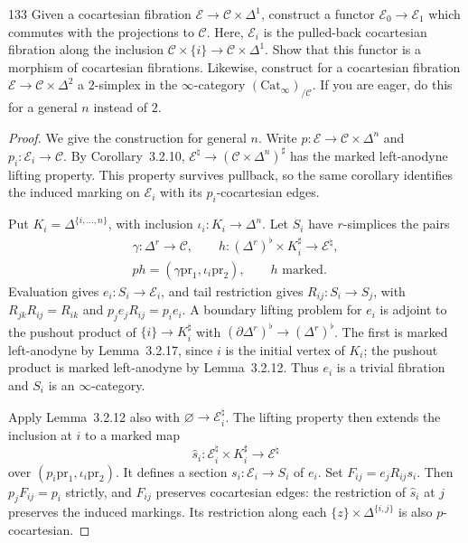 \begin{exercise}{133}
Given a cocartesian fibration $\mathcal E\to\mathcal C\times\Delta^1$, construct a functor $\mathcal E_0\to\mathcal E_1$
which commutes with the projections to $\mathcal C$. Here, $\mathcal E_i$ is the pulled-back cocartesian
fibration along the inclusion $\mathcal C\times\{i\}\to\mathcal C\times\Delta^1$. Show that this functor is a morphism
of cocartesian fibrations. Likewise, construct for a cocartesian fibration $\mathcal E\to\mathcal C\times\Delta^2$ a
$2$-simplex in the $\infty$-category $(\mathrm{Cat}_\infty)_{/\mathcal C}$. If you are eager, do this for a general $n$ instead
of $2$.

\begin{proof}
We give the construction for general $n$.
Write $p\colon\mathcal E\to\mathcal C\times\Delta^n$ and
$p_i\colon\mathcal E_i\to\mathcal C$.
By Corollary~3.2.10, $\mathcal E^{\natural}\to(\mathcal C\times\Delta^n)^{\sharp}$
has the marked left-anodyne lifting property.
This property survives pullback, so the same corollary identifies the
induced marking on $\mathcal E_i$ with its $p_i$-cocartesian edges.

Put $K_i=\Delta^{\{i,\ldots,n\}}$, with inclusion $\iota_i\colon K_i\to\Delta^n$.
Let $S_i$ have $r$-simplices the pairs
\[
 \begin{gathered}
  \gamma\colon\Delta^r\to\mathcal C,\qquad
  h\colon(\Delta^r)^{\flat}\times K_i^{\sharp}\to\mathcal E^{\natural},\\
  ph=(\gamma\mathrm{pr}_1,\iota_i\mathrm{pr}_2),\qquad h\text{ marked}.
 \end{gathered}
\]
Evaluation gives $e_i\colon S_i\to\mathcal E_i$, and tail restriction gives
$R_{ij}\colon S_i\to S_j$, with $R_{jk}R_{ij}=R_{ik}$ and
$p_je_jR_{ij}=p_ie_i$.
A boundary lifting problem for $e_i$ is adjoint to the pushout product
of $\{i\}\to K_i^{\sharp}$ with
$(\partial\Delta^r)^{\flat}\to(\Delta^r)^{\flat}$.
The first is marked left-anodyne by Lemma~3.2.17, since $i$ is the initial
vertex of $K_i$; the pushout product is marked left-anodyne by Lemma~3.2.12.
Thus $e_i$ is a trivial fibration and $S_i$ is an $\infty$-category.

Apply Lemma~3.2.12 also with $\varnothing\to\mathcal E_i^{\natural}$.
The lifting property then extends the inclusion at $i$ to a marked map
\[
 \widehat s_i\colon\mathcal E_i^{\natural}\times K_i^{\sharp}
 \longrightarrow\mathcal E^{\natural}
\]
over $(p_i\mathrm{pr}_1,\iota_i\mathrm{pr}_2)$.
It defines a section $s_i\colon\mathcal E_i\to S_i$ of $e_i$.
Set $F_{ij}=e_jR_{ij}s_i$.
Then $p_jF_{ij}=p_i$ strictly, and $F_{ij}$ preserves cocartesian edges:
the restriction of $\widehat s_i$ at $j$ preserves the induced markings.
Its restriction along each $\{z\}\times\Delta^{\{i,j\}}$ is also
$p$-cocartesian.


\end{proof}
\end{exercise}
